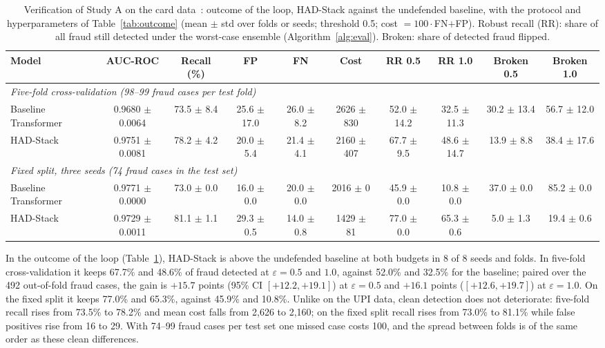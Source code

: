 \documentclass[conference]{IEEEtran}
\begin{document}
\begin{table}[t]
\centering
\caption{Verification of Study A on the card data~\cite{dalpozzolo2015}: outcome of the loop, HAD-Stack against the undefended baseline, with the protocol and hyperparameters of Table~\ref{tab:outcome} (mean $\pm$ std over folds or seeds; threshold 0.5; cost $=100\cdot$FN$+$FP). Robust recall (RR): share of all fraud still detected under the worst-case ensemble (Algorithm~\ref{alg:eval}). Broken: share of detected fraud flipped.}
\label{tab:verA}
\footnotesize
\setlength{\tabcolsep}{3pt}
\begin{tabular}{lccccccccc}
\toprule
Model & AUC-ROC & Recall (\%) & FP & FN & Cost & RR 0.5 & RR 1.0 & Broken 0.5 & Broken 1.0\\
\midrule
\multicolumn{10}{l}{\emph{Five-fold cross-validation (98--99 fraud cases per test fold)}}\\
Baseline Transformer & 0.9680 $\pm$ 0.0064 & 73.5 $\pm$ 8.4 & 25.6 $\pm$ 17.0 & 26.0 $\pm$ 8.2 & 2626 $\pm$ 830 & 52.0 $\pm$ 14.2 & 32.5 $\pm$ 11.3 & 30.2 $\pm$ 13.4 & 56.7 $\pm$ 12.0\\
HAD-Stack & 0.9751 $\pm$ 0.0081 & 78.2 $\pm$ 4.2 & 20.0 $\pm$ 5.4 & 21.4 $\pm$ 4.1 & 2160 $\pm$ 407 & 67.7 $\pm$ 9.5 & 48.6 $\pm$ 14.7 & 13.9 $\pm$ 8.8 & 38.4 $\pm$ 17.6\\
\midrule
\multicolumn{10}{l}{\emph{Fixed split, three seeds (74 fraud cases in the test set)}}\\
Baseline Transformer & 0.9771 $\pm$ 0.0000 & 73.0 $\pm$ 0.0 & 16.0 $\pm$ 0.0 & 20.0 $\pm$ 0.0 & 2016 $\pm$ 0 & 45.9 $\pm$ 0.0 & 10.8 $\pm$ 0.0 & 37.0 $\pm$ 0.0 & 85.2 $\pm$ 0.0\\
HAD-Stack & 0.9729 $\pm$ 0.0011 & 81.1 $\pm$ 1.1 & 29.3 $\pm$ 0.5 & 14.0 $\pm$ 0.8 & 1429 $\pm$ 81 & 77.0 $\pm$ 0.0 & 65.3 $\pm$ 0.6 & 5.0 $\pm$ 1.3 & 19.4 $\pm$ 0.6\\
\bottomrule
\end{tabular}
\end{table}

In the outcome of the loop (Table~\ref{tab:verA}), HAD-Stack is above the undefended baseline at both budgets in 8 of 8 seeds and folds. In five-fold cross-validation it keeps 67.7\% and 48.6\% of fraud detected at $\varepsilon{=}0.5$ and $1.0$, against 52.0\% and 32.5\% for the baseline; paired over the 492 out-of-fold fraud cases, the gain is $+15.7$ points (95\% CI $[+12.2,+19.1]$) at $\varepsilon{=}0.5$ and $+16.1$ points ($[+12.6,+19.7]$) at $\varepsilon{=}1.0$. On the fixed split it keeps 77.0\% and 65.3\%, against 45.9\% and 10.8\%. Unlike on the UPI data, clean detection does not deteriorate: five-fold recall rises from 73.5\% to 78.2\% and mean cost falls from 2,626 to 2,160; on the fixed split recall rises from 73.0\% to 81.1\% while false positives rise from 16 to 29. With 74--99 fraud cases per test set one missed case costs 100, and the spread between folds is of the same order as these clean differences.
\end{document}
